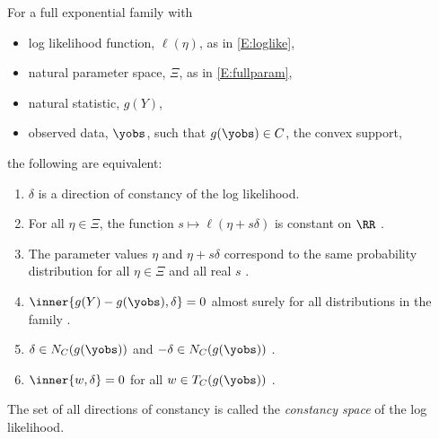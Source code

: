 \begin{theorem} \label{Thm:DOC}
For a full exponential family with
\begin{itemize}
\item log likelihood function, $\ell(\eta)$, as in \eqref{E:loglike},
\item natural parameter space, $\Xi$, as in \eqref{E:fullparam},
\item natural statistic, $g(Y)$,
\item observed data, $\yobs$, such that $g(\yobs) \in C$, the convex 
support,
\end{itemize}
the following are equivalent:
\begin{enumerate}
\item $\delta$ is a direction of constancy of the log likelihood.
\item For all $\eta \in \Xi$, the function $s \mapsto \ell( \eta + s\delta)$ is 
constant on $\RR$ \cite[Theorem 1 (b)]{Geyer:gdor}.
\item The parameter values $\eta$ and  $\eta + s\delta$ correspond to the same 
probability distribution for all $\eta \in \Xi$ and all real $s$ \cite[Theorem 1 (d)]
{Geyer:gdor}.
\item $\inner{g(Y) - g(\yobs),\delta} = 0$ almost surely for all distributions in the 
family \cite[Theorem 1 (f)]{Geyer:gdor}.
\item $\delta \in N_C(g(\yobs))$ and $-\delta \in N_C(g(\yobs))$ \cite[Theorem 1 (g)]
{Geyer:gdor}.
\item $\inner{w,\delta} = 0$ for all $w \in T_C(g(\yobs))$ \cite[Theorem 1 (h)]
{Geyer:gdor}.
\end{enumerate}
\end{theorem}
The set of all directions of constancy is called the \emph{constancy space} of the log 
likelihood.

